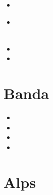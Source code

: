 \begin{small}
\begin{itemize}
\item[\twothousandthree] 
\item[\twothousandthirteen] 
  \\
  \\
\item[\twothousandtwenty] 
\item[\twothousandtwentytwo] 
\end{itemize}
\end{small}

\section{Banda}

\begin{small}
\begin{itemize}
\item[\twothousandnine]
\item[\twothousandten]
\item[\twothousandtwentyone]
\item[\twothousandtwentytwo]
\end{itemize}
\end{small}

\section{Alps}


